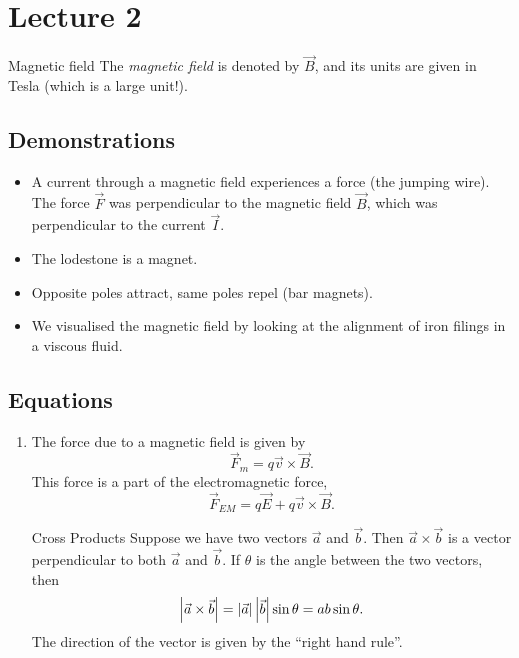 \documentclass[class=article, crop=false]{standalone}
\begin{document}
  \section{Lecture 2}
  \begin{definition}{Magnetic field}
    The \emph{magnetic field} is denoted by $\vec{B}$, and its units are given in Tesla (which is a large unit!).
  \end{definition}
  \subsection{Demonstrations}
  \begin{itemize}
    \item A current through a magnetic field experiences a force (the jumping wire). The force $\vec{F}$ was perpendicular to the magnetic field $\vec{B}$, which was perpendicular to the current $\vec{I}$.
    \item The lodestone is a magnet.
    \item Opposite poles attract, same poles repel (bar magnets).
    \item We visualised the magnetic field by looking at the alignment of iron filings in a viscous fluid.
  \end{itemize}
  \subsection{Equations}
  \begin{enumerate}
    \item The force due to a magnetic field is given by
    \[
      \vec{F}_m = q\vec{v}\times \vec{B}.
    \]
    This force is a part of the electromagnetic force, 
    \[
      \vec{F}_{EM} = q\vec{E} + q\vec{v}\times \vec{B}.
    \]
    \begin{note}{Cross Products}
      Suppose we have two vectors $\vec{a}$ and $\vec{b}$. Then $\vec{a}\times \vec{b}$ is a vector perpendicular to both $\vec{a}$ and $\vec{b}$. If $\theta$ is the angle between the two vectors, then
      \[
        \left\lvert \vec{a}\times \vec{b} \right\rvert = \left\lvert \vec{a} \right\rvert\left\lvert \vec{b} \right\rvert\sin\theta = ab\sin\theta.
      \]
      The direction of the vector is given by the ``right hand rule''.
    \end{note}
  \end{enumerate}
\end{document}
